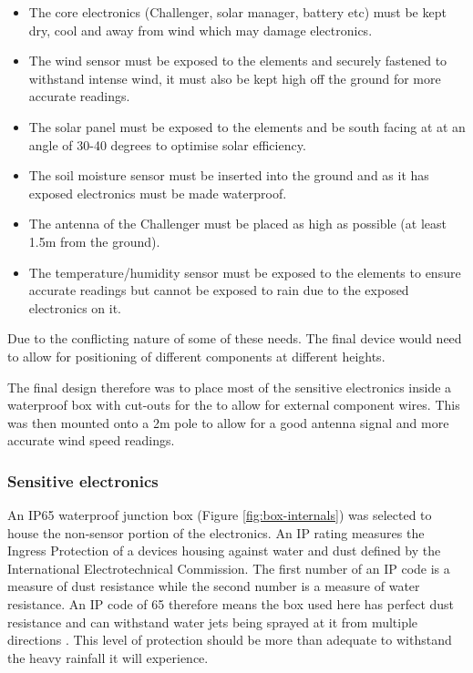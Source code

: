 \begin{itemize}
    \item The core electronics (Challenger, solar manager, battery etc) must be
          kept dry, cool and away from wind which may damage electronics.
    \item The wind sensor must be exposed to the elements and securely fastened
          to withstand intense wind, it must also be kept high off the ground
          for more accurate readings.
    \item The solar panel must be exposed to the elements and be south facing at
          at an angle of 30-40 degrees to optimise solar efficiency.
    \item The soil moisture sensor must be inserted into the ground and as it
          has exposed electronics must be made waterproof.
    \item The antenna of the Challenger must be placed as high as possible (at
          least 1.5m from the ground).
    \item The temperature/humidity sensor must be exposed to the elements to
          ensure accurate readings but cannot be exposed to rain due to the
          exposed electronics on it.
\end{itemize}

Due to the conflicting nature of some of these needs. The final device would
need to allow for positioning of different components at different heights.

The final design therefore was to place most of the sensitive electronics inside
a waterproof box with cut-outs for the to allow for external component wires.
This was then mounted onto a 2m pole to allow for a good antenna signal and more
accurate wind speed readings.

\subsubsection{Sensitive electronics}

An IP65 waterproof junction box (Figure \ref{fig:box-internals}) was selected to
house the non-sensor portion of the electronics. An IP rating measures the
Ingress Protection of a devices housing against water and dust defined by the
International Electrotechnical Commission. The first number of an IP code is a
measure of dust resistance while the second number is a measure of water
resistance. An IP code of 65 therefore means the box used here has perfect dust
resistance and can withstand water jets being sprayed at it from multiple
directions \cite{wiki-ip}. This level of protection should be more than adequate
to withstand the heavy rainfall it will experience.

